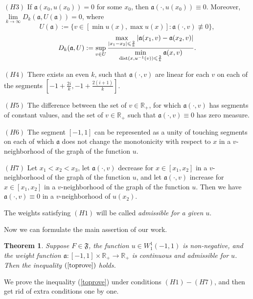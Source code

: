 \documentclass[12pt]{article}
\newcommand{\Real}{\mathbb R}
\newcommand{\abs}[1]{\left\vert#1\right\vert}
\renewcommand{\le}{\leqslant}
\newtheorem{thm}{Theorem}
\newcommand{\W}{W_1^1}
\newcommand{\dist}{\mathop{\rm dist}\nolimits}
\begin{document}
\bigskip
\noindent
$(H3)$ If $\mathfrak a(x_0, u(x_0)) = 0$ for some $x_0$, then $\mathfrak a(\cdot, u(x_0)) \equiv 0$.
Moreover, $\lim\limits_{k \to \infty} D_k(\mathfrak a, U(\mathfrak a)) = 0$, where
$$U(\mathfrak a) := \{ v \in [\min u(x), \max u(x)]: \mathfrak a(\cdot, v) \not \equiv 0 \},$$
\begin{equation}
\label{bigD}
D_k(\mathfrak a, U): = \sup \limits_{v \in U}
\frac{\max \limits_{\abs{x_1 - x_2} \le \frac{2}{k}} \abs{\mathfrak a(x_1, v) - \mathfrak a(x_2, v)}}
{\min \limits_{\dist (x, u^{-1} (v)) \le \frac{2}{k}} \mathfrak a(x, v)}.
\end{equation}

\bigskip
\noindent
$(H4)$ There exists an even $k$, such that $\mathfrak a(\cdot, v)$ are linear for each $v$ on each of the segments
$[-1 + \frac{2i}{k}, -1 + \frac{2(i + 1)}{k}]$.

\bigskip
\noindent
$(H5)$ The difference between the
set of $v \in \Real_+$, for which $\mathfrak a(\cdot, v)$ has segments of constant values,
and the set of $v \in \Real_+$ such that $\mathfrak a(\cdot, v) \equiv 0$
has zero measure.

\bigskip
\noindent
$(H6)$ The segment $[-1, 1]$ can be represented as a unity of touching segments
on each of which $\mathfrak a$ does not change the monotonicity with respect to $x$ in a $v$-neighborhood of the graph of the function $u$.

\bigskip
\noindent
$(H7)$ Let $x_1 < x_2 < x_3$,
let $\mathfrak a(\cdot, v)$ decrease for $x \in [x_1, x_2]$ in a $v$-neighborhood of the graph of the function $u$,
and let $\mathfrak a(\cdot, v)$ increase for $x \in [x_1, x_2]$ in a $v$-neighborhood of the graph of the function $u$.
Then we have $\mathfrak a(\cdot, v) \equiv 0$ in a $v$-neighborhood of $u(x_2)$.

\bigskip

The weights satisfying $(H1)$ will be called {\it admissible for a given $u$}.

\medskip

Now we can formulate the main assertion of our work.
\begin{thm}
\label{mainThm}
Suppose $F \in \mathfrak{F}$, the function $u \in \W(-1, 1)$ is non-negative,
and the weight function $\mathfrak a: [-1, 1] \times \Real_+ \to \Real_+$ is continuous
and admissible for $u$.
Then the inequality $(\ref{toprove})$ holds.
\end{thm}

We prove the inequality (\ref{toprove}) under conditions $(H1)-(H7)$,
and then get rid of extra conditions one by one.
\end{document}
